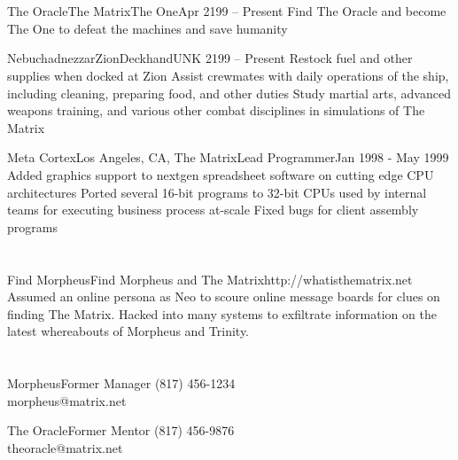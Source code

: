 \documentclass{resume}
\begin{document}

\section*{}

\begin{job}{The Oracle}{The Matrix}{The One}{Apr 2199 -- Present}
	\bullet Find The Oracle and become The One to defeat the machines and save humanity
\end{job}

\begin{job}{Nebuchadnezzar}{Zion}{Deckhand}{UNK 2199 -- Present}
	\bullet Restock fuel and other supplies when docked at Zion
	\bullet Assist crewmates with daily operations of the ship, including
		cleaning, preparing food, and other duties
	\bullet Study martial arts, advanced weapons training, and various other
		combat disciplines in simulations of The Matrix
\end{job}

\begin{job}{Meta Cortex}{Los Angeles, CA, The Matrix}{Lead Programmer}{Jan 1998 - May 1999}
	\bullet Added graphics support to nextgen spreadsheet software on cutting
	edge CPU architectures
	\bullet Ported several 16-bit programs to 32-bit CPUs used by internal
		teams for executing business process at-scale
	\bullet Fixed bugs for client assembly programs
\end{job}

\section*{}

\begin{project}{Find Morpheus}{Find Morpheus and The Matrix}{http://whatisthematrix.net}
	Assumed an online persona as Neo to scoure online message boards for clues
	on finding The Matrix.  Hacked into many systems to exfiltrate information
	on the latest whereabouts of Morpheus and Trinity.
\end{project}


\section*{}

\begin{reference}{Morpheus}{Former Manager}
	(817) 456-1234\\
	morpheus@matrix.net
\end{reference}

\begin{reference}{The Oracle}{Former Mentor}
	(817) 456-9876\\
	theoracle@matrix.net
\end{reference}
\end{document}
